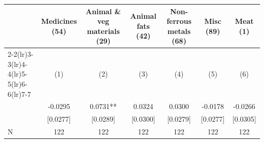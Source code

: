 {
\def\sym#1{\ifmmode^{#1}\else\(^{#1}\)\fi}
\begin{tabular}{l*{6}{c}}
\toprule
            &\multicolumn{1}{c}{Medicines (54)}&\multicolumn{1}{c}{Animal \& veg materials (29)}&\multicolumn{1}{c}{Animal fats (42)}&\multicolumn{1}{c}{Non-ferrous metals (68)}&\multicolumn{1}{c}{Misc (89)}&\multicolumn{1}{c}{Meat (1)}\\\cmidrule(lr){2-2}\cmidrule(lr){3-3}\cmidrule(lr){4-4}\cmidrule(lr){5-5}\cmidrule(lr){6-6}\cmidrule(lr){7-7}
            &\multicolumn{1}{c}{(1)}   &\multicolumn{1}{c}{(2)}   &\multicolumn{1}{c}{(3)}   &\multicolumn{1}{c}{(4)}   &\multicolumn{1}{c}{(5)}   &\multicolumn{1}{c}{(6)}   \\
\midrule
{}          &     -0.0295   &      0.0731** &      0.0324   &      0.0300   &     -0.0178   &     -0.0266   \\
            &    [0.0277]   &    [0.0289]   &    [0.0300]   &    [0.0279]   &    [0.0277]   &    [0.0305]   \\
\midrule
N           &         122   &         122   &         122   &         122   &         122   &         122   \\
\bottomrule
\end{tabular}
}
